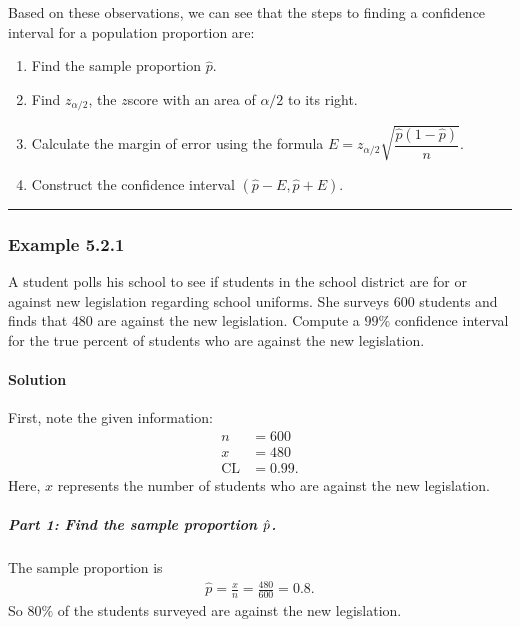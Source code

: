 \documentclass[letterpaper,10pt,english]{jupyterBook}
\begin{document}
\sphinxAtStartPar
Based on these observations, we can see that the steps to finding a confidence interval for a population proportion are:
\begin{enumerate}
%
\item {} 
\sphinxAtStartPar
Find the sample proportion \(\hat{p}\).

\item {} 
\sphinxAtStartPar
Find \(z_{\alpha/2}\), the \(z\)\sphinxhyphen{}score with an area of \(\alpha/2\) to its right.

\item {} 
\sphinxAtStartPar
Calculate the margin of error using the formula \(E = z_{\alpha/2}\sqrt{\dfrac{\hat{p}(1 - \hat{p})}{n}}\).

\item {} 
\sphinxAtStartPar
Construct the confidence interval \((\hat{p} - E, \hat{p} + E)\).

\end{enumerate}


\bigskip\hrule\bigskip



\subsubsection{Example 5.2.1}
\label{\detokenize{Ch5 Confidence Intervals/5.2 Estimating Population Proportions:example-5-2-1}}
\sphinxAtStartPar
A student polls his school to see if students in the school district are for or against new legislation regarding school uniforms. She surveys \(600\) students and finds that \(480\) are against the new legislation. Compute a \(99\%\) confidence interval for the true percent of students who are against the new legislation.


\paragraph{Solution}
\label{\detokenize{Ch5 Confidence Intervals/5.2 Estimating Population Proportions:solution}}
\sphinxAtStartPar
First, note the given information:
\begin{align*}
n &= 600 \\
x &= 480 \\
\text{CL} &= 0.99.
\end{align*}
\sphinxAtStartPar
Here, \(x\) represents the number of students who are against the new legislation.


\subparagraph{Part 1: Find the sample proportion \protect\(\hat{p}\protect\).}
\label{\detokenize{Ch5 Confidence Intervals/5.2 Estimating Population Proportions:part-1-find-the-sample-proportion-hat-p}}
\sphinxAtStartPar
The sample proportion is
\begin{equation*}
\begin{split} \hat{p} = \frac{x}{n} = \frac{480}{600} = 0.8. \end{split}
\end{equation*}
\sphinxAtStartPar
So \(80\%\) of the students surveyed are against the new legislation.
\end{document}
